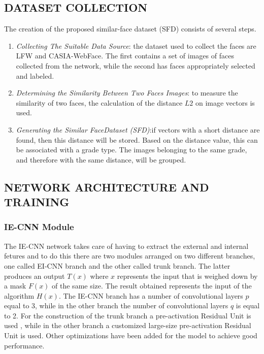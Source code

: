 \subsection{DATASET COLLECTION}
The creation of the proposed similar-face dataset (SFD) consists of several steps.
\begin{enumerate}
    \item \emph{Collecting The Suitable Data Source}: the dataset used to collect the 
    faces are LFW and CASIA-WebFace. The first contains a set of images 
    of faces collected from the network, while the second has faces 
    appropriately selected and labeled.
    \item \emph{Determining the Similarity Between Two Faces Images}: to measure 
    the similarity of two faces, the calculation of the distance $L2$ on image 
    vectors is used.
    \item \emph{Generating the Similar FaceDataset (SFD)}:if vectors with a short distance 
    are found, then this distance will be stored. Based on the distance 
    value, this can be associated with a grade type. The images belonging 
    to the same grade, and therefore with the same distance, will be 
    grouped.
\end{enumerate}

\subsection{NETWORK ARCHITECTURE AND TRAINING}
\subsubsection{IE-CNN Module}
The IE-CNN network takes care of having to extract the external and internal 
fetures and to do this there are two modules arranged on two different 
branches, one called EI-CNN branch and the other called trunk branch. The 
latter produces an output $T (x)$ where $x$ represents the input that is weighed 
down by a mask $F (x)$ of the same size. The result obtained represents 
the input of the algorithm $H (x)$. The IE-CNN branch has a number of 
convolutional layers $p$ equal to 3, while in the other branch the number of 
convolutional layers $q$ is equal to 2. For the construction of the trunk branch 
a pre-activation Residual Unit is used \cite{0902694026}, while in the other branch 
a customized large-size pre-activation Residual Unit is used. Other optimizations 
have been added for the model to achieve good performance.

